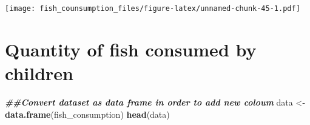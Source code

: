 \documentclass[
]{article}
\newenvironment{Shaded}{\begin{snugshade}}{\end{snugshade}}
\newcommand{\DocumentationTok}[1]{\textcolor[rgb]{0.56,0.35,0.01}{\textbf{\textit{#1}}}}
\newcommand{\FunctionTok}[1]{\textcolor[rgb]{0.13,0.29,0.53}{\textbf{#1}}}
\newcommand{\NormalTok}[1]{#1}
\newcommand{\OtherTok}[1]{\textcolor[rgb]{0.56,0.35,0.01}{#1}}
\begin{document}
\texttt{[image: fish\_counsumption\_files/figure-latex/unnamed-chunk-45-1.pdf]}

\hypertarget{quantity-of-fish-consumed-by-children}{%
\section{Quantity of fish consumed by
children}\label{quantity-of-fish-consumed-by-children}}

\begin{Shaded}
\begin{Highlighting}[]
\DocumentationTok{\#\#Convert dataset as data frame in order to add new coloum}
\NormalTok{data }\OtherTok{\textless{}{-}} \FunctionTok{data.frame}\NormalTok{(fish\_consumption)}
\FunctionTok{head}\NormalTok{(data)}
\end{Highlighting}
\end{Shaded}
\end{document}
